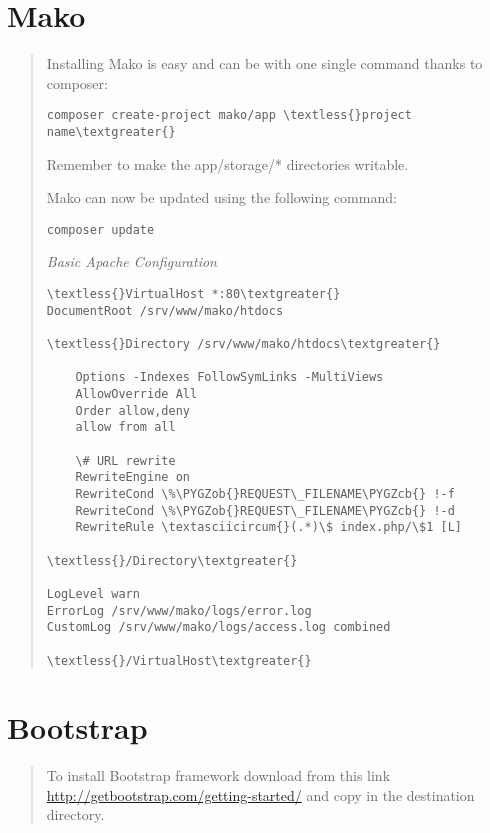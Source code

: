\documentclass[letterpaper,10pt,english]{sphinxmanual}
\def\PYGZob{\char`\{}
\def\PYGZcb{\char`\}}
\begin{document}
\section{Mako}
\label{prerequisites:id1}\begin{quote}

Installing Mako is easy and can be with one single command thanks to composer:

\begin{Verbatim}[commandchars=\\\{\}]
composer create-project mako/app \textless{}project name\textgreater{}
\end{Verbatim}

Remember to make the app/storage/* directories writable.

Mako can now be updated using the following command:

\begin{Verbatim}[commandchars=\\\{\}]
composer update
\end{Verbatim}

\emph{Basic Apache Configuration}

\begin{Verbatim}[commandchars=\\\{\}]
\textless{}VirtualHost *:80\textgreater{}
DocumentRoot /srv/www/mako/htdocs

\textless{}Directory /srv/www/mako/htdocs\textgreater{}

    Options -Indexes FollowSymLinks -MultiViews
    AllowOverride All
    Order allow,deny
    allow from all

    \# URL rewrite
    RewriteEngine on
    RewriteCond \%\PYGZob{}REQUEST\_FILENAME\PYGZcb{} !-f
    RewriteCond \%\PYGZob{}REQUEST\_FILENAME\PYGZcb{} !-d
    RewriteRule \textasciicircum{}(.*)\$ index.php/\$1 [L]

\textless{}/Directory\textgreater{}

LogLevel warn
ErrorLog /srv/www/mako/logs/error.log
CustomLog /srv/www/mako/logs/access.log combined

\textless{}/VirtualHost\textgreater{}
\end{Verbatim}
\end{quote}


\section{Bootstrap}
\label{prerequisites:id2}\begin{quote}

To install Bootstrap framework download from this link \href{http://getbootstrap.com/getting-started/}{http://getbootstrap.com/getting-started/} and copy in the destination directory.
\end{quote}
\end{document}
